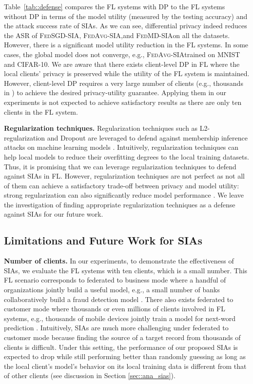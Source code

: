 \documentclass[10pt,journal,compsoc]{IEEEtran}
\newcommand*\fedavg{\textsc{FedAvg-SIA}}
\newcommand*\fedsgd{\textsc{FedSGD-SIA}}
\newcommand*\fedmd{\textsc{FedMD-SIA}}
\begin{document}
Table~\ref{tab::defense} compares the FL systems with DP to the FL systems without DP in terms of the model utility (measured by the testing accuracy) and the attack success rate of SIAs.  As we can see, differential privacy indeed reduces the ASR of \fedsgd, \fedavg,\;and \fedmd \;on all the datasets. However, there is a significant model utility reduction in the FL systems. In some cases, the global model does not converge, {e.g.,} \fedavg\;trained on MNIST and CIFAR-10. We are aware that there exists client-level DP \cite{geyer2017differentially,mcmahan2017learning} in FL where the local clients' privacy is preserved while the utility of the FL system is maintained. However, client-level DP requires a very large number of clients (e.g., thousands in \cite{mcmahan2017learning}) to achieve the desired privacy-utility guarantee. Applying them in our experiments is not expected to achieve satisfactory results as there are only ten clients in the FL system. 

\noindent \textbf{Regularization techniques. \;} Regularization techniques such as L2-regularization and Dropout \cite{srivastava2014dropout} are leveraged to defend against membership inference attacks on machine learning models \cite{hu2022membership}. Intuitively, regularization techniques can help local models to reduce their overfitting degrees to the local training datasets. Thus, it is promising that we can leverage regularization techniques to defend against SIAs in FL. However, regularization techniques are not perfect as not all of them can achieve a satisfactory trade-off between privacy and model utility: strong regularization can also significantly reduce model performance \cite{shokri2017membership}. We leave the investigation of finding appropriate regularization techniques as a defense against SIAs for our future work.

\subsection{Limitations and Future Work for SIAs}
\noindent \textbf{Number of clients. \;} In our experiments, to demonstrate the effectiveness of SIAs, we evaluate the FL systems with ten clients, which is a small number. This FL scenario corresponds to federated to business mode where a handful of organizations jointly build a useful model, e.g., a small number of banks collaboratively build a fraud detection model \cite{lyu2022privacy,yang2019federated}. There also exists federated to customer mode where thousands or even millions of clients involved in FL systems, e.g., thousands of mobile devices jointly train a model for next-word prediction \cite{mcmahan2018learning}. Intuitively, SIAs are much more challenging under federated to customer mode because finding the source of a target record from thousands of clients is difficult. Under this setting, the performance of our proposed SIAs is expected to drop while still performing better than randomly guessing as long as the local client’s model’s behavior on its local training data is different from that of other clients (see discussion in Section \ref{sec::ana_sias}). 
\end{document}
